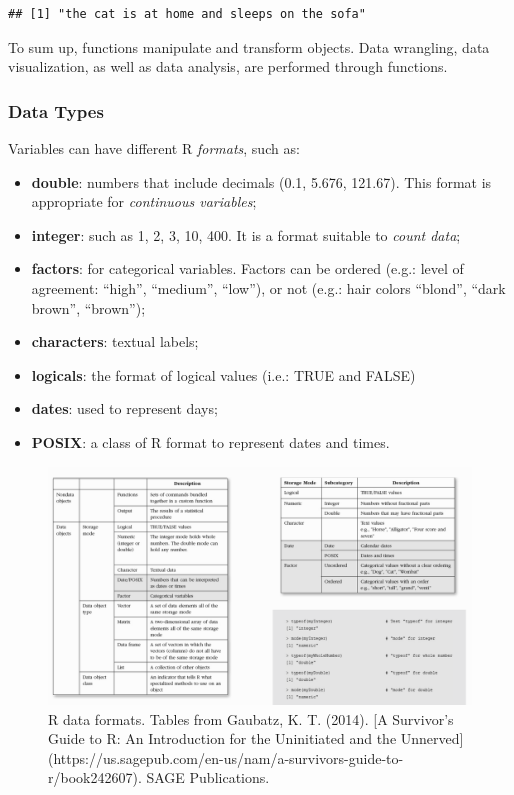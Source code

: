 \documentclass[
]{article}
\providecommand{\tightlist}{%
  \setlength{\itemsep}{0pt}\setlength{\parskip}{0pt}}
\begin{document}
\begin{verbatim}
## [1] "the cat is at home and sleeps on the sofa"
\end{verbatim}

To sum up, functions manipulate and transform objects. Data wrangling, data visualization, as well as data analysis, are performed through functions.

\hypertarget{data-types}{%
\subsubsection{Data Types}\label{data-types}}

Variables can have different R \emph{formats}, such as:

\begin{itemize}
\tightlist
\item
  \textbf{double}: numbers that include decimals (0.1, 5.676, 121.67). This format is appropriate for \emph{continuous variables};
\item
  \textbf{integer}: such as 1, 2, 3, 10, 400. It is a format suitable to \emph{count data};
\item
  \textbf{factors}: for categorical variables. Factors can be ordered (e.g.: level of agreement: ``high'', ``medium'', ``low''), or not (e.g.: hair colors ``blond'', ``dark brown'', ``brown'');
\item
  \textbf{characters}: textual labels;
\item
  \textbf{logicals}: the format of logical values (i.e.: TRUE and FALSE)
\item
  \textbf{dates}: used to represent days;
\item
  \textbf{POSIX}: a class of R format to represent dates and times.
\end{itemize}

\begin{figure}
\includegraphics[width=33.54in]{images/r-data-format} \caption{R data formats. Tables from Gaubatz, K. T. (2014). [A Survivor's Guide to R: An Introduction for the Uninitiated and the Unnerved](https://us.sagepub.com/en-us/nam/a-survivors-guide-to-r/book242607). SAGE Publications.}\label{fig:unnamed-chunk-39}
\end{figure}
\end{document}
